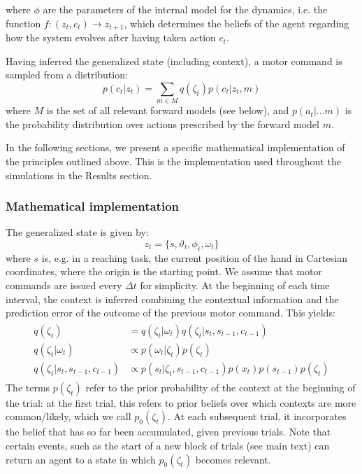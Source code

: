 \documentclass[a4paper,doc,floatsintext,natbib]{apa6}
\begin{document}
where $\phi$ are the parameters of the internal model for the dynamics,
i.e. the function $f: (z_t, c_t) \rightarrow z_{t+1}$, which determines the beliefs of
the agent regarding how the system evolves after having taken action $c_t$.

Having inferred the generalized state (including context), a motor command is
sampled from a distribution:
\begin{equation}
p(c_t | z_t) = \displaystyle\sum_{m \in M}q(\zeta_t)p(c_t | z_t, m)
\end{equation}
where $M$ is the set of all relevant forward models (see below), and
$p(a_t | ... m)$ is the probability distribution over actions prescribed by the
forward model $m$.

In the following sections, we present a specific mathematical implementation
of the principles outlined above. This is the implementation used throughout the
simulations in the Results section.

\subsubsection{Mathematical implementation}
The generalized state is given by:
\begin{equation}
z_t = \{s, \vartheta_t, \phi_t, \omega_t\}
\end{equation}
where $s$ is, e.g. in a reaching task, the current position of the hand in
Cartesian coordinates, where the origin is the starting point. We assume that
motor commands are issued every $\Delta t$ for simplicity. At the beginning of
each time interval, the context is inferred combining the contextual
information and the prediction error of the outcome of the previous motor
command. This yields:
\begin{align}
  \begin{split}
  q(\zeta_t) &= q(\zeta_t | \omega_t)q(\zeta_t | s_t, s_{t-1}, c_{t-1}) \\ \label{eqn:estimated-context}
  q(\zeta_t | \omega_t) &\propto p(\omega_t | \zeta_t)p(\zeta_t) \\
  q(\zeta_t | s_t, s_{t-1}, c_{t-1}) &\propto p(s_t | \zeta_t, s_{t-1}, c_{t-1})p(x_t)p(s_{t-1})p(\zeta_t)
  \end{split}
\end{align}
The terms $p(\zeta_t)$ refer to the prior probability of the context at the
beginning of the trial: at the first trial, this refers to prior beliefs over
which contexts are more common/likely, which we call $p_0(\zeta_t)$. At each
subsequent trial, it incorporates the belief that has so far been accumulated,
given previous trials. Note that certain events, such as the start of a new
block of trials (see main text) can return an agent to a state in which
$p_0(\zeta_t)$ becomes relevant.
\end{document}
